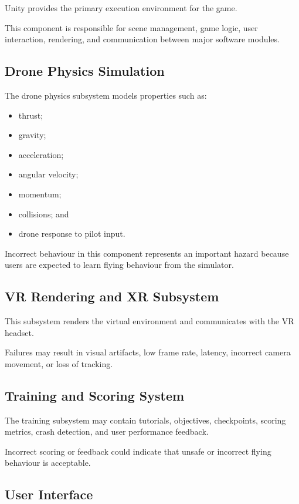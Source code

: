 \documentclass{article}
\begin{document}
Unity provides the primary execution environment for the game.

This component is responsible for scene management, game logic, user
interaction, rendering, and communication between major software modules.

\subsection{Drone Physics Simulation}

The drone physics subsystem models properties such as:

\begin{itemize}
    \item thrust;
    \item gravity;
    \item acceleration;
    \item angular velocity;
    \item momentum;
    \item collisions; and
    \item drone response to pilot input.
\end{itemize}

Incorrect behaviour in this component represents an important hazard because
users are expected to learn flying behaviour from the simulator.

\subsection{VR Rendering and XR Subsystem}

This subsystem renders the virtual environment and communicates with the VR
headset.

Failures may result in visual artifacts, low frame rate, latency, incorrect
camera movement, or loss of tracking.

\subsection{Training and Scoring System}

The training subsystem may contain tutorials, objectives, checkpoints, scoring
metrics, crash detection, and user performance feedback.

Incorrect scoring or feedback could indicate that unsafe or incorrect flying
behaviour is acceptable.

\subsection{User Interface}
\end{document}
